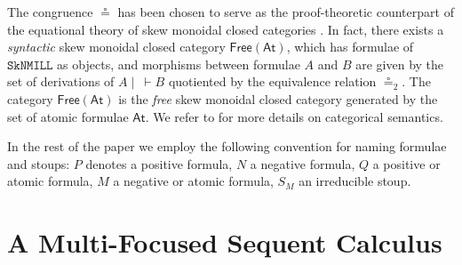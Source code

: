 \documentclass[runningheads]{llncs}
\newcommand{\SkNMILL}{\texttt{SkNMILL}}
\newcommand{\FSkMCC}{\mathsf{Free}}
\newcommand{\At}{\mathsf{At}}
\begin{document}
The congruence $\circeq$ has been chosen to serve as the proof-theoretic counterpart of the equational theory of skew monoidal closed categories \cite{street:skew-closed:2013}.
In fact, there exists a \emph{syntactic} skew monoidal closed category $\FSkMCC(\At)$, which has formulae of $\SkNMILL$ as objects, and morphisms between formulae $A$ and $B$ are given by the set of derivations of $A \mid ~ \vdash B$ quotiented by the equivalence relation $\circeq_2$. The category $\FSkMCC(\At)$ is the \emph{free} skew monoidal closed category generated by the set of atomic formulae $\At$. We refer to \cite{UVW:protsn} for more details on categorical semantics.

In the rest of the paper we employ the following convention for naming formulae and stoups:
$P$ denotes a positive formula, $N$ a negative formula, $Q$ a positive or atomic formula, $M$ a negative or atomic formula, $S_M$ an irreducible stoup.





\section{A Multi-Focused Sequent Calculus}\label{sec:focus}
\end{document}
